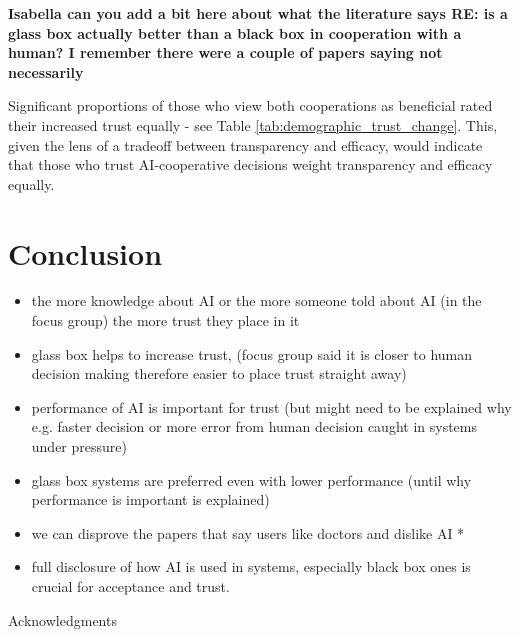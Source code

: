 \documentclass[manuscript,screen,review]{acmart}
\begin{document}
\textbf{Isabella can you add a bit here about what the literature says RE: is a glass box actually better than a black box in cooperation with a human? I remember there were a couple of papers saying not necessarily}

Significant proportions of those who view both cooperations as beneficial rated their increased trust equally - see Table \ref{tab:demographic_trust_change}. This, given the lens of a tradeoff between transparency and efficacy, would indicate that those who trust AI-cooperative decisions weight transparency and efficacy equally. 


\section{Conclusion}

\begin{itemize}
    \item the more knowledge about AI or the more someone told about AI (in the focus group) the more trust they place in it
    \item glass box helps to increase trust, (focus group said it is closer to human decision making therefore easier to place trust straight away)
    \item performance of AI is important for trust (but might need to be explained why e.g. faster decision or more error from human decision caught in systems under pressure)
    \item glass box systems are preferred even with lower performance (until why performance is important is explained)
    \item we can disprove the papers that say users like doctors and dislike AI *
    \item full disclosure of how AI is used in systems, especially black box ones is crucial for acceptance and trust.
\end{itemize}



\begin{acks}
Acknowledgments
\end{acks}

\newpage


\end{document}
